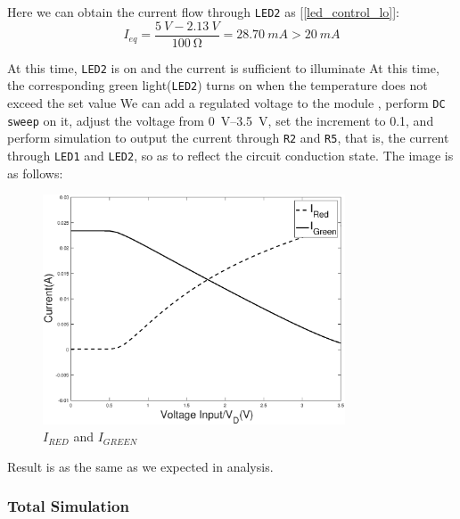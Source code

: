 \documentclass[12pt]{article}
\numberwithin{equation}{section}
\begin{document}
Here we can obtain the current flow through \verb|LED2| as [\ref{led_control_lo}]:
\begin{equation}
	I_{eq}=\frac{\qty{5}{V} -\qty{2.13}{V}}{\qty{100}{\ohm}}=\qty{28.70}{mA} >\qty{20}{mA} \label{led_control_lo}
\end{equation}


At this time, \verb|LED2| is on and the current is sufficient to illuminate At this time, the corresponding green light(\verb|LED2|) turns on when the temperature does not exceed the set value
We can add a regulated voltage to the module %
, perform \verb|DC sweep| on it, adjust the voltage from \qtyrange{0}{3.5}{V}, set the increment to \num{0.1}, and perform simulation to output the current through \verb|R2| and \verb|R5|, that is, the current through \verb|LED1| and \verb|LED2|, so as to reflect the circuit conduction state. The image is as follows:


\begin{figure}[H] %
\centering %
\includegraphics[width=0.8\textwidth]{LED_module_diagram} %
\caption{$I_{RED}$ and $I_{GREEN}$} %
\label{Fig.LED_module_diagram} %
\end{figure}


Result is as the same as we expected in analysis.



\subsubsection{Total Simulation}
\end{document}
